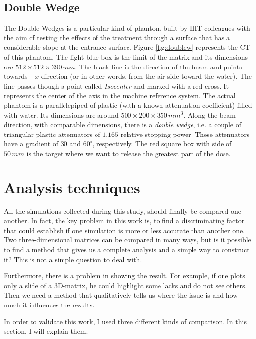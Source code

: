 \documentclass[12pt, a4paper, twoside]{book}
\begin{document}
\subsection{Double Wedge} 
The Double Wedges is a particular kind of phantom built by HIT colleagues with the aim of testing the effects of the treatment through a surface that has a considerable slope at the entrance surface. 
Figure \ref{fig:doublew} represents the CT of this phantom. The light blue box is the limit of the matrix and its dimensions are $512\times512\times390\,mm$. The black line is the direction of the beam and points towards $-x$ direction (or in other words, from the air side toward the water). The line passes though a point called \emph{Isocenter} and marked with a red cross. It represents the center of the axis in the machine reference system.
The actual phantom is a parallelepiped of plastic (with a known attenuation coefficient) filled with water. Its dimensions are around $500\times200\times350\,mm^3$. Along the beam direction, with comparable dimensions, there is a \emph{double wedge}, i.e. a couple of triangular plastic attenuators of $1.165$ relative stopping power. These attenuators have a gradient of $30$ and $60^\circ$, respectively.
The red square box with side of $50\,mm$ is the target where we want to release the greatest part of the dose. 

\section{Analysis techniques}
All the simulations collected during this study, should finally be compared one another. 
In fact, the key problem in this work is, to find a discriminating factor that could establish if one simulation is more or less accurate than another one. Two three-dimensional matrices can be compared in many ways, but is it possible to find a method that gives us a complete analysis and a simple way to construct it?
This is not a simple question to deal with. 

Furthermore, there is a problem in showing the result. For example, if one plots only a slide of a 3D-matrix, he could highlight some lacks and do not see others. Then we need a method that qualitatively tells us where the issue is and how much it influences the results.

In order to validate this work, I used three different kinds of comparison. In this section, I will explain them.
\end{document}
